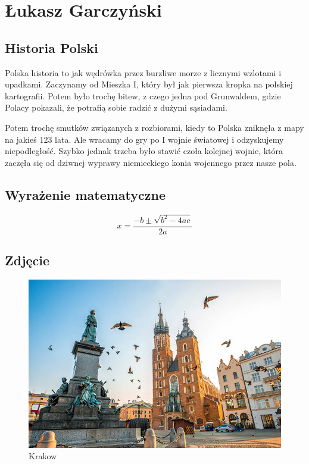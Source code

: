 \section{Łukasz Garczyński}
\label{sec::garczynskil}

\subsection{Historia Polski}

\hspace{1cm} Polska historia to jak wędrówka przez burzliwe morze z licznymi wzlotami i upadkami. Zaczynamy od Mieszka I, który był jak pierwsza kropka na polskiej kartografii. Potem było trochę bitew, z czego jedna pod Grunwaldem, gdzie Polacy pokazali, że potrafią sobie radzić z dużymi sąsiadami.

\hspace{1cm} Potem trochę smutków związanych z rozbiorami, kiedy to Polska zniknęła z mapy na jakieś 123 lata. Ale wracamy do gry po I wojnie światowej i odzyskujemy niepodległość. Szybko jednak trzeba było stawić czoła kolejnej wojnie, która zaczęła się od dziwnej wyprawy niemieckiego konia wojennego przez nasze pola.

\subsection{Wyrażenie matematyczne}
\begin{equation}
     x = \frac{-b \pm \sqrt{b^2 - 4ac}}{2a}
\end{equation}

\subsection{Zdjęcie}

\vspace{0,5cm}
\begin{figure}[htbp]
\centering
\includegraphics[scale=1.8]{pictures/krakow.jpeg}
\vspace{0,5cm}
\caption{Krakow}
\label{fig:krakow}
\end{figure}

